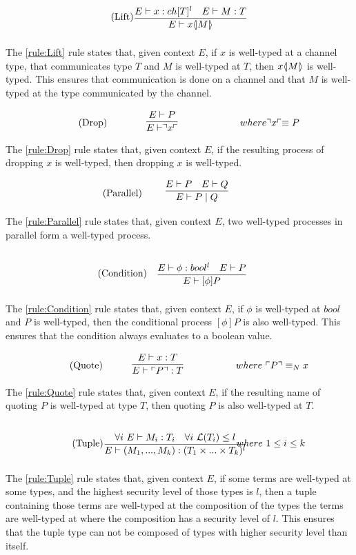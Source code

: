 \begin{align*}
    \tag{Lift}\label{rule:Lift} &\infrule{E\vdash x:ch[T]^l\quad E \vdash M:T}{E\vdash \lift{x}{M}}
\end{align*}
The \ref{rule:Lift} rule states that, given context $E$, if $x$ is well-typed at a channel type, that communicates type $T$ and $M$ is well-typed at $T$, then $x \langle \! | M | \! \rangle$ is well-typed.
This ensures that communication is done on a channel and that $M$ is well-typed at the type communicated by the channel.

\begin{align*}
    \tag{Drop}\label{rule:Drop} &\infrule{E \vdash P}{E\vdash \drop{x}}& where \drop{x} \equiv P
\end{align*}
The \ref{rule:Drop} rule states that, given context $E$, if the resulting process of dropping $x$ is well-typed, then dropping $x$ is well-typed.

\begin{align*}
    \tag{Parallel}\label{rule:Parallel} &\infrule{E\vdash P \quad E \vdash Q}{E \vdash P \para Q}
\end{align*}
The \ref{rule:Parallel} rule states that, given context $E$, two well-typed processes in parallel form a well-typed process.

\begin{align*}
\tag{Condition}\label{rule:Condition} &\infrule{E\vdash \phi:bool^l\quad E\vdash P}{E \vdash [\phi] P}
\end{align*}
The \ref{rule:Condition} rule states that, given context $E$, if $\phi$ is well-typed at $bool$ and $P$ is well-typed, then the conditional process $[\phi]P$ is also well-typed. This ensures that the condition always evaluates to a boolean value.

\begin{align*}
    \tag{Quote}\label{rule:Quote} &\infrule{E \vdash x:T}{E\vdash \quot{P}:T}& where\ \quot{P} \equiv_N x
\end{align*}
The \ref{rule:Quote} rule states that, given context $E$, if the resulting name of quoting $P$ is well-typed at type $T$, then quoting $P$ is also well-typed at $T$.

\begin{align*}
\tag{Tuple}\label{rule:Tuple} &\infrule{\forall i\ E\vdash M_i:T_i\quad \forall i\ \level{T_i}\leq l}{E\vdash (M_1,...,M_k):(T_1\times...\times T_k)^l}& where\ 1\leq i\leq k
\end{align*}
The \ref{rule:Tuple} rule states that, given context $E$, if some terms are well-typed at some types, and the highest security level of those types is $l$, then a tuple containing those terms are well-typed at the composition of the types the terms are well-typed at where the composition has a security level of $l$.
This ensures that the tuple type can not be composed of types with higher security level than itself.

